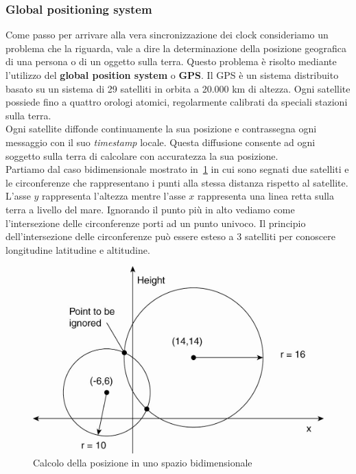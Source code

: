 \subsubsection{Global positioning system}
Come passo per arrivare alla vera sincronizzazione dei clock consideriamo un problema che la riguarda, vale a dire la determinazione della posizione geografica di una persona o di un oggetto sulla terra. Questo problema è risolto mediante l'utilizzo del \textbf{global position system} o \textbf{GPS}. Il GPS è un sistema distribuito basato su un sistema di 29 satelliti in orbita a 20.000 km di altezza. Ogni satellite possiede fino a quattro orologi atomici, regolarmente calibrati da speciali stazioni sulla terra. \\
Ogni satellite diffonde continuamente la sua posizione e contrassegna ogni messaggio con il suo \emph{timestamp} locale.
Questa diffusione consente ad ogni soggetto sulla terra di calcolare con accuratezza la sua posizione.\\
Partiamo dal caso bidimensionale mostrato in \figurename\,\ref{fig:gps} in cui sono segnati due satelliti e le circonferenze che rappresentano i punti alla stessa distanza rispetto al satellite. L'asse $y$ rappresenta l'altezza mentre l'asse $x$ rappresenta una linea retta sulla terra a livello del mare. Ignorando il punto più in alto vediamo come l'intersezione delle circonferenze porti ad un punto univoco. Il principio dell'intersezione delle circonferenze può essere esteso a 3 satelliti per conoscere longitudine latitudine e altitudine.
\begin{figure}
\centering
\includegraphics[scale=0.4]{img/gps.png}
\caption{Calcolo della posizione in uno spazio bidimensionale}\label{fig:gps}
\end{figure}
